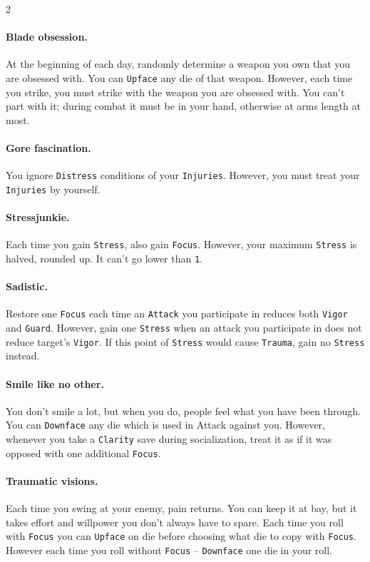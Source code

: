 \documentclass{osr-template/zine}
\begin{document}
\begin{multicols*}{2}
\paragraph{Blade obsession.} At the beginning of each day, randomly determine a weapon you own that you are obsessed with.
You can \texttt{Upface} any die of that weapon. However, each time you strike, you must strike with the weapon you are obsessed with.
You can't part with it; during combat it must be in your hand, otherwise at arms length at most.

\paragraph{Gore fascination.} You ignore \texttt{Distress} conditions of your \texttt{Injuries}.
However, you must treat your \texttt{Injuries} by yourself.

\paragraph{Stressjunkie.} Each time you gain \texttt{Stress}, also gain \texttt{Focus}.
However, your maximum \texttt{Stress} is halved, rounded up. It can't go lower than \texttt{1}.

\paragraph{Sadistic.} Restore one \texttt{Focus} each time an \texttt{Attack} you participate in reduces both \texttt{Vigor} and \texttt{Guard}.
However, gain one \texttt{Stress} when an attack you participate in does not reduce target's \texttt{Vigor}. If this point of \texttt{Stress} would cause \texttt{Trauma}, gain no \texttt{Stress} instead.

\paragraph{Smile like no other.} You don't smile a lot, but when you do, people feel what you have been through.
You can \texttt{Downface} any die which is used in Attack against you.
However, whenever you take a \texttt{Clarity} save during socialization, treat it as if it was opposed with one additional \texttt{Focus}.

\paragraph{Traumatic visions.} Each time you swing at your enemy, pain returns. You can keep it at bay, but it takes effort and willpower you don't always have to spare.
Each time you roll with \texttt{Focus} you can \texttt{Upface} on die before choosing what die to copy with \texttt{Focus}. 
However each time you roll without \texttt{Focus} -- \texttt{Downface} one die in your roll.





\end{multicols*}

\newpage
\label{sec:ch_sheet}

\end{document}

